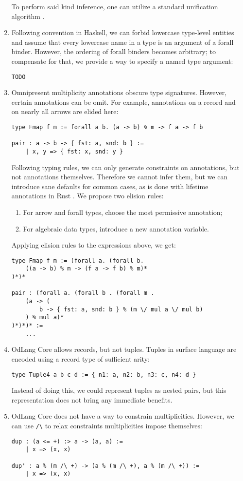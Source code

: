 \documentclass[a4paper,14pt]{extreport}
\begin{document}
\begin{enumerate}
        To perform said kind inference, one can utilize a standard unification
        algorithm \cite{milner}.
    \item Following convention in Haskell, we can forbid lowercase type-level
        entities and assume that every lowercase name in a type is an argument
        of a forall binder. However, the ordering of forall binders becomes
        arbitrary; to compensate for that, we provide a way to specify a named
        type argument:
\begin{verbatim}
TODO
\end{verbatim}
    \item Omnipresent multiplicity annotations obscure type signatures.
        However, certain annotations can be omit. For example, annotations on a
        record and on nearly all arrows are elided here:
\begin{verbatim}
type Fmap f m := forall a b. (a -> b) % m -> f a -> f b

pair : a -> b -> { fst: a, snd: b } :=
    | x, y => { fst: x, snd: y }
\end{verbatim}
        Following typing rules, we can only generate constraints on annotations,
        but not annotations themselves. Therefore we cannot infer them, but we
        can introduce sane defaults for common cases, as is done with lifetime
        annotations in Rust \cite{elision}. We propose two elision rules:
        \begin{enumerate}
            \item For arrow and forall types, choose the most permissive
                annotation;
            \item For algebraic data types, introduce a new annotation variable.
        \end{enumerate}
        Applying elision rules to the expressions above, we get:
\begin{verbatim}
type Fmap f m := (forall a. (forall b.
    ((a -> b) % m -> (f a -> f b) % m)*
)*)*

pair : (forall a. (forall b . (forall m .
    (a -> (
        b -> { fst: a, snd: b } % (m \/ mul a \/ mul b)
    ) % mul a)*
)*)*)* :=
    ...
\end{verbatim}
    \item OdLang Core allows records, but not tuples. Tuples in surface language
        are encoded using a record type of sufficient arity:
\begin{verbatim}
type Tuple4 a b c d := { n1: a, n2: b, n3: c, n4: d }
\end{verbatim}
        Instead of doing this, we could represent tuples as nested pairs, but
        this representation does not bring any immediate benefits.
    \item OdLang Core does not have a way to constrain multiplicities. However,
        we can use \verb|/\| to relax constraints multiplicities impose
        themselves:
\begin{verbatim}
dup : (a <= +) :> a -> (a, a) :=
    | x => (x, x)

dup' : a % (m /\ +) -> (a % (m /\ +), a % (m /\ +)) :=
    | x => (x, x)
\end{verbatim}
\end{enumerate}
\end{document}
